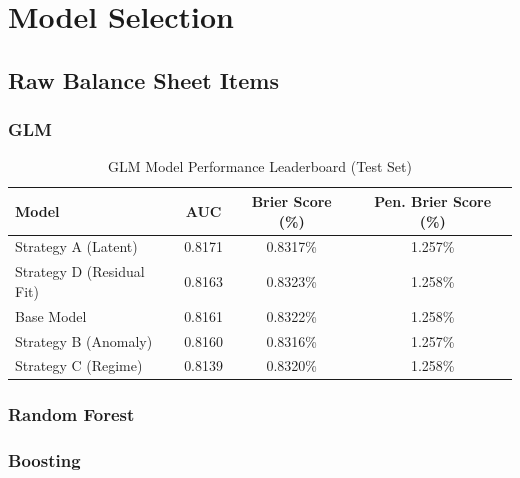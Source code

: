 \documentclass{report}\usepackage[]{graphicx}\usepackage[]{xcolor}
\begin{document}

\chapter{Model Selection}

\section{Raw Balance Sheet Items}

\subsection{GLM}

\begin{table}[h]
    \centering
    \caption{GLM Model Performance Leaderboard (Test Set)}
    \label{tab:glm_leaderboard_test}
    \begin{tabular}{lccc}
        \hline
        \textbf{Model} & \textbf{AUC} & \textbf{Brier Score (\%)} & \textbf{Pen. Brier Score (\%)} \\
        \hline
        Strategy A (Latent) & 0.8171 & 0.8317\% & 1.257\% \\
        Strategy D (Residual Fit) & 0.8163 & 0.8323\% & 1.258\% \\
        Base Model & 0.8161 & 0.8322\% & 1.258\% \\
        Strategy B (Anomaly) & 0.8160 & 0.8316\% & 1.257\% \\
        Strategy C (Regime) & 0.8139 & 0.8320\% & 1.258\% \\
        \hline
    \end{tabular}
\end{table}

\subsection{Random Forest}

\subsection{Boosting}
\end{document}
